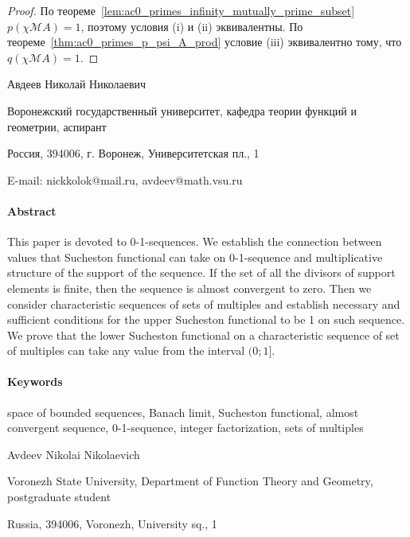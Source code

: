 \documentclass[a4paper,openbib]{article}
\theoremstyle{definition}
\begin{document}
\begin{proof}
	По теореме~\ref{lem:ac0_primes_infinity_mutually_prime_subset} $p(\chi\mathscr{M}A)=1$,
	поэтому условия (i) и (ii) эквивалентны.
	По теореме~\ref{thm:ac0_primes_p_psi_A_prod} условие (iii) эквивалентно тому, что $q(\chi\mathscr{M}A)=1$.
\end{proof}

Авдеев Николай Николаевич

Воронежский государственный университет, кафедра теории функций и геометрии, аспирант

Россия, 394006, г. Воронеж, Университетская пл., 1

E-mail: nickkolok@mail.ru, avdeev@math.vsu.ru


\paragraph{Abstract}

This paper is devoted to 0-1-sequences.
We establish the connection between values that Sucheston functional can take
on 0-1-sequence and multiplicative structure of the support of the sequence.
If the set of all the divisors of support elements is finite,
then the sequence is almost convergent to zero.
Then we consider characteristic sequences of sets of multiples
and establish necessary and sufficient conditions
for the upper Sucheston functional
to be 1 on such sequence.
We prove that the lower Sucheston functional
on a characteristic sequence of set of multiples can take any value from the interval $(0;1]$.

\paragraph{Keywords}
	space of bounded sequences,
	Banach limit,
	Sucheston functional,
	almost convergent sequence,
	0-1-sequence,
	integer factorization,
	sets of multiples


Avdeev Nikolai Nikolaevich

Voronezh State University, Department of Function Theory and Geometry, postgraduate student

Russia, 394006, Voronezh, University sq., 1
\end{document}
